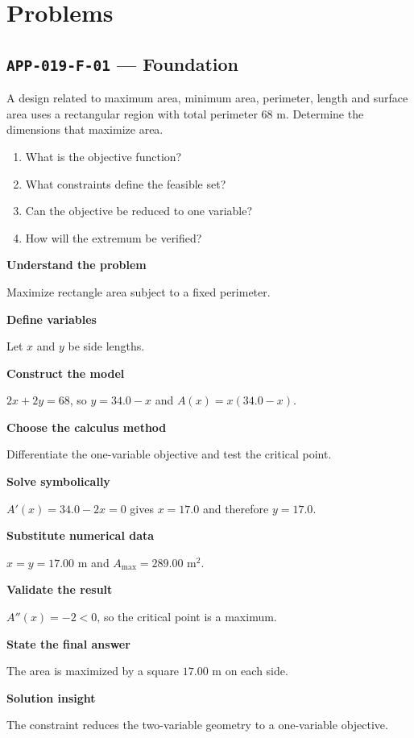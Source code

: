 \documentclass[11pt]{book}
\newcommand{\pid}[1]{\texttt{#1}}
\begin{document}
\section*{Problems}
\subsection*{\pid{APP-019-F-01} — Foundation}
\begin{problembox}
A design related to maximum area, minimum area, perimeter, length and surface area uses a rectangular region with total perimeter 68 m. Determine the dimensions that maximize area.
\end{problembox}
\begin{promptbox}\begin{enumerate}
\item What is the objective function?
\item What constraints define the feasible set?
\item Can the objective be reduced to one variable?
\item How will the extremum be verified?
\end{enumerate}\end{promptbox}
\begin{solutionbox}
\textbf{Understand the problem}\par Maximize rectangle area subject to a fixed perimeter.\par\medskip
\textbf{Define variables}\par Let $x$ and $y$ be side lengths.\par\medskip
\textbf{Construct the model}\par $2x+2y=68$, so $y=34.0-x$ and $A(x)=x(34.0-x)$.\par\medskip
\textbf{Choose the calculus method}\par Differentiate the one-variable objective and test the critical point.\par\medskip
\textbf{Solve symbolically}\par $A'(x)=34.0-2x=0$ gives $x=17.0$ and therefore $y=17.0$.\par\medskip
\textbf{Substitute numerical data}\par $x=y=17.00$ m and $A_{\max}=289.00$ m$^2$.\par\medskip
\textbf{Validate the result}\par $A''(x)=-2<0$, so the critical point is a maximum.\par\medskip
\textbf{State the final answer}\par The area is maximized by a square $17.00$ m on each side.\par\medskip
\textbf{Solution insight}\par The constraint reduces the two-variable geometry to a one-variable objective.\par\medskip
\end{solutionbox}
\end{document}
